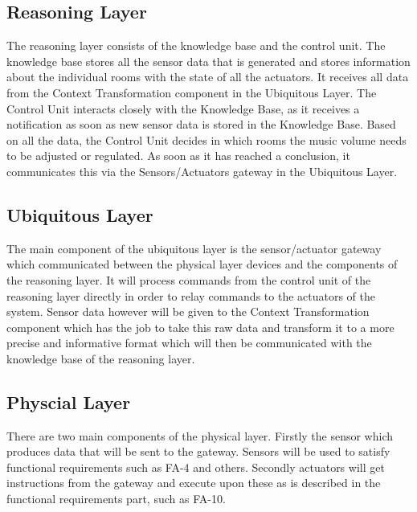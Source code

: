 \documentclass[runningheads]{llncs}
\begin{document}
\subsection{Reasoning Layer}
The reasoning layer consists of the knowledge base and the control unit. The knowledge base stores all the sensor data that is generated and stores information about the individual rooms with the state of all the actuators. It receives all data from the Context Transformation component in the Ubiquitous Layer. The Control Unit interacts closely with the Knowledge Base, as it receives a notification as soon as new sensor data is stored in the Knowledge Base. Based on all the data, the Control Unit decides in which rooms the music volume needs to be adjusted or regulated. As soon as it has reached a conclusion, it communicates this via the Sensors/Actuators gateway in the Ubiquitous Layer. 

\subsection{Ubiquitous Layer}
The main component of the ubiquitous layer is the sensor/actuator gateway which communicated between the physical layer devices and the components of the reasoning layer. It will process commands from the control unit of the reasoning layer directly in order to relay commands to the actuators of the system. Sensor data however will be given to the Context Transformation component which has the job to take this raw data and transform it to a more precise and informative format which will then be communicated with the knowledge base of the reasoning layer.

\subsection{Physcial Layer}
There are two main components of the physical layer. Firstly the sensor which produces data that will be sent to the gateway. Sensors will be used to satisfy functional requirements such as FA-4 and others. Secondly actuators will get instructions from the gateway and execute upon these as is described in the functional requirements part, such as FA-10. 



%
%
%
%

\end{document}
